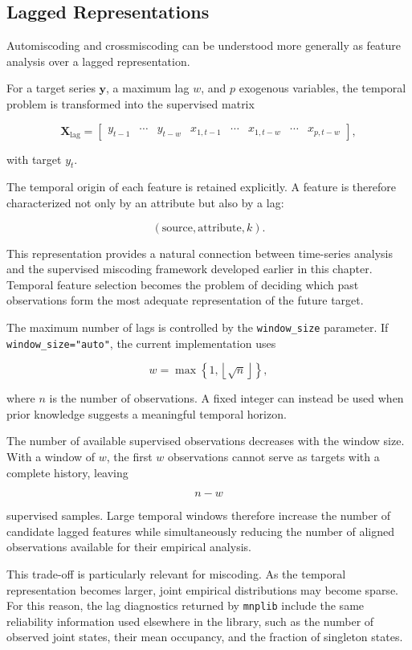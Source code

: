 \subsection*{Lagged Representations}

Automiscoding and crossmiscoding can be understood more generally as feature
analysis over a lagged representation.

For a target series \(\mathbf{y}\), a maximum lag \(w\), and \(p\) exogenous
variables, the temporal problem is transformed into the supervised matrix

\[
\mathbf{X}_{\mathrm{lag}}
=
\begin{bmatrix}
y_{t-1} &
\cdots &
y_{t-w} &
x_{1,t-1} &
\cdots &
x_{1,t-w} &
\cdots &
x_{p,t-w}
\end{bmatrix},
\]

with target \(y_t\).

The temporal origin of each feature is retained explicitly. A feature is
therefore characterized not only by an attribute but also by a lag:

\[
(\text{source},\text{attribute},k).
\]

This representation provides a natural connection between time-series analysis
and the supervised miscoding framework developed earlier in this chapter.
Temporal feature selection becomes the problem of deciding which past
observations form the most adequate representation of the future target.

The maximum number of lags is controlled by the \texttt{window\_size}
parameter. If \texttt{window\_size="auto"}, the current implementation uses

\[
w
=
\max\left\{
1,
\left\lfloor\sqrt{n}\right\rfloor
\right\},
\]

where \(n\) is the number of observations. A fixed integer can instead be used
when prior knowledge suggests a meaningful temporal horizon.

The number of available supervised observations decreases with the window
size. With a window of \(w\), the first \(w\) observations cannot serve as
targets with a complete history, leaving

\[
n-w
\]

supervised samples. Large temporal windows therefore increase the number of
candidate lagged features while simultaneously reducing the number of aligned
observations available for their empirical analysis.

This trade-off is particularly relevant for miscoding. As the temporal
representation becomes larger, joint empirical distributions may become sparse.
For this reason, the lag diagnostics returned by \texttt{mnplib} include the
same reliability information used elsewhere in the library, such as the number
of observed joint states, their mean occupancy, and the fraction of singleton
states.

